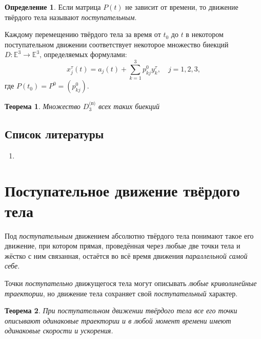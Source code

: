 \documentclass{article}
\theoremstyle{definition}
\newtheorem{definition}{Определение}[section]
\theoremstyle{plain}
\newtheorem{theorem}{Теорема}[section]
\theoremstyle{remark}
\numberwithin{equation}{section}
\begin{document}
\begin{definition}
  Если матрица $P(t)$ не зависит от времени, то движение твёрдого тела называют
  \textit{поступательным}.
\end{definition}

Каждому перемещению твёрдого тела за время от $t_0$ до $t$ в некотором
поступательном движении соответствует некоторое множество биекций
$D : \mathbb{E}^3 \to \mathbb{E}^3$, определяемых формулами:
\begin{equation*}
  x_j^\tau(t) = a_j(t) + \sum_{k=1}^{3} p_{kj}^0 y_k^\tau, \quad j = 1,2,3,
\end{equation*}
где $P(t_0) = P^0 = (p_{kj}^0)$.


\begin{theorem}
  Множество $D_3^{\text{(п)}}$ всех таких биекций
\end{theorem}

\subsection{Список литературы}
\begin{enumerate}
  \item \cite{lectures}
\end{enumerate}

\pagebreak

\section{Поступательное движение твёрдого тела}

Под \textit{поступательным} движением абсолютно твёрдого тела понимают такое его
движение, при котором прямая, проведённая через любые две точки тела и жёстко с
ним связанная, остаётся во всё время движения \textit{параллельной самой себе}.

Точки \textit{поступательно} движущегося тела могут описывать \textit{любые
криволинейные траектории}, но движение тела сохраняет свой
\textit{поступательный} характер.

\begin{theorem}
  При поступательном движении твёрдого тела все его точки описывают одинаковые
  траектории и в любой момент времени имеют одинаковые скорости и ускорения.
\end{theorem}
\end{document}
